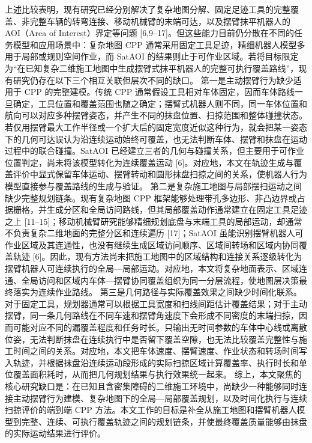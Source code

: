 {}\markdownRendererParagraphSeparator
{}\markdownRendererSectionBegin
{}\markdownRendererInterblockSeparator
{}上述比较表明，现有研究已经分别解决了复杂地图分解、固定足迹工具的完整覆盖、非完整车辆的转弯连接、移动机械臂的末端可达，以及摆臂抹平机器人的 AOI（Area of Interest）界定等问题 [6,9–17]。但这些能力目前仍分散在不同的任务模型和应用场景中：复杂地图 CPP 通常采用固定工具足迹，精细机器人模型多用于局部或规则空间作业，而 SatAOI 的结果则止于可作业区域。若将目标限定为“在已知复杂二维施工地图中生成摆臂式抹平机器人的完整可执行覆盖路线”，现有研究仍存在以下三个相互关联但层次不同的缺口。\markdownRendererParagraphSeparator
{}第一是主动摆臂行为缺少适用于 CPP 的完整建模。传统 CPP 通常假设工具相对车体固定，因而车体路线一旦确定，工具位置和覆盖范围也随之确定；摆臂式机器人则不同，同一车体位置和航向可以对应多种摆臂姿态，并产生不同的抹盘位置、扫掠范围和整体碰撞状态。若仅用摆臂最大工作半径或一个扩大后的固定宽度近似这种行为，就会把某一姿态下的几何可达误认为沿连续运动始终可覆盖，也无法判断车体、摆臂和抹盘在运动过程中的联合碰撞。SatAOI 已经建立三者的几何与碰撞关系，但主要用于可作业位置判定，尚未将该模型转化为连续覆盖运动 [6]。对应地，本文在轨迹生成与覆盖评价中显式保留车体运动、摆臂转动和圆形抹盘扫掠之间的关系，使机器人行为模型直接参与覆盖路线的生成与验证。\markdownRendererParagraphSeparator
{}第二是复杂施工地图与局部摆扫运动之间缺少完整规划链条。现有复杂地图 CPP 框架能够处理带孔多边形、非凸边界或占据栅格，并生成分区和全局访问路线，但其局部覆盖动作通常建立在固定工具足迹之上 [11–15]；移动机械臂研究能够精细规划底盘与末端工具的局部运动，却通常不负责复杂二维地面的完整分区和连续遍历 [17]；SatAOI 虽能识别摆臂机器人可作业区域及其连通性，也没有继续生成区域访问顺序、区域间转场和区域内协同覆盖轨迹 [6]。因此，现有方法尚未把施工地图中的区域结构和连接关系逐级转化为摆臂机器人可连续执行的全局—局部运动。对应地，本文将复杂地面表示、区域连通、全局访问和区域内车体—摆臂协同覆盖组织为同一分层流程，使地图层决策最终落实为连续作业路线。\markdownRendererParagraphSeparator
{}第三是几何路径与实际覆盖效果之间缺少时间化联系。对于固定工具，规划器通常可以根据工具宽度和扫线间距估计覆盖结果；对于主动摆臂，同一条几何路线在不同车速和摆臂角速度下会形成不同密度的末端扫掠，因而可能对应不同的漏覆盖程度和任务时长。只输出无时间参数的车体中心线或离散位姿，无法判断抹盘在连续执行中是否留下覆盖空隙，也无法比较覆盖完整性与施工时间之间的关系。对应地，本文把车体速度、摆臂速度、作业状态和转场时间写入轨迹，并根据抹盘沿连续运动段形成的实际扫掠区域计算覆盖率、执行时长和单位覆盖面积耗时，从而把几何规划结果与执行效果统一起来。\markdownRendererParagraphSeparator
{}综上，本文聚焦的核心研究缺口是：在已知且含密集障碍的二维施工环境中，尚缺少一种能够同时连接主动摆臂行为建模、复杂地图下的全局—局部覆盖规划，以及时间化执行与连续扫掠评价的端到端 CPP 方法。本文工作的目标是补全从施工地图和摆臂机器人模型到完整、连续、可执行覆盖轨迹之间的规划链条，并使最终覆盖质量能够由抹盘的实际运动结果进行评价。
\markdownRendererSectionEnd
\markdownRendererSectionEnd
\markdownRendererSectionEnd \markdownRendererDocumentEnd
